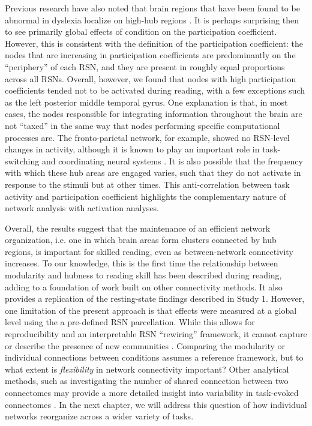 Previous research have also noted that brain regions that have been found to be abnormal in dyslexia localize on high-hub regions \citep{Bailey2018}. It is perhaps surprising then to see primarily global effects of condition on the participation coefficient. However, this is consistent with the definition of the participation coefficient: the nodes that are increasing in participation coefficients are predominantly on the ``periphery'' of each RSN, and they are present in roughly equal proportions across all RSNs. Overall, however, we found that nodes with high participation coefficients tended not to be activated during reading, with a few exceptions such as the left posterior middle temporal gyrus. One explanation is that, in most cases, the nodes responsible for integrating information throughout the brain are not ``taxed'' in the same way that nodes performing specific computational processes are. The fronto-parietal network, for example, showed no RSN-level changes in activity, although it is known to play an important role in task-switching and coordinating neural systems \citep{Cole2013}. It is also possible that the frequency with which these hub areas are engaged varies, such that they do not activate in response to the stimuli but at other times. This anti-correlation between task activity and participation coefficient highlights the complementary nature of network analysis with activation analyses. 

Overall, the results suggest that the maintenance of an efficient network organization, i.e. one in which brain areas form clusters connected by hub regions, is important for skilled reading, even as between-network connectivity increases. To our knowledge, this is the first time the relationship between modularity and hubness to reading skill has been described during reading, adding to a foundation of work built on other connectivity methods. It also provides a replication of the resting-state findings described in Study 1. However, one limitation of the present approach is that effects were measured at a global level using the a pre-defined RSN parcellation. While this allows for reproducibility and an interpretable RSN ``rewiring'' framework, it cannot capture or describe the presence of new communities \citep{Power2011}. Comparing the modularity or individual connections between conditions assumes a reference framework, but to what extent is \textit{flexibility} in network connectivity important? Other analytical methods, such as investigating the number of shared connection between two connectomes may provide a more detailed insight into variability in task-evoked connectomes \citep{Petersen2015}. In the next chapter, we will address this question of how individual networks reorganize across a wider variety of tasks.
